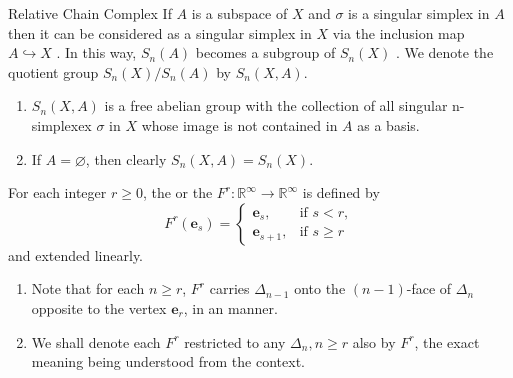 \documentclass[../main.tex]{subfiles}
\begin{document}
\begin{definition}{Relative Chain Complex}{}
    If \(  A  \) is a subspace of \(  X  \) and \(   \sigma   \) is a singular simplex in \(  A  \)  then it can be considered as a singular simplex in \(  X  \) via the inclusion map \(  A\hookrightarrow X  \) .    In this way, \(  S_{n}\left( A \right)   \) becomes a subgroup of \(  S_{n}\left( X \right)   \) . We denote the quotient group \(  S_{n}\left( X \right)/ S_{n}\left( A \right)    \) by \(  S_{n}\left( X,A \right)   \).        
\end{definition}
\begin{remark}
    \begin{enumerate}
        \item \(  S_{n}\left( X,A \right)   \) is a free abelian group with the collection of all singular n-simplexex \(   \sigma    \) in \(  X  \) whose image is not contained in \(  A  \) as a basis.    
        \item If \(  A = \varnothing  \), then clearly \(  S_{n}\left( X,A \right)=  S_{n}   \left( X \right) \).  
    \end{enumerate}
    
\end{remark}
\begin{definition}{}{}
For each integer $r \ge 0$, the  or the  $F^r : \mathbb{R}^\infty \to \mathbb{R}^\infty$ is defined by
\[
F^r(\mathbf{e}_s) = \begin{cases} \mathbf{e}_s, & \text{if } s < r, \\ \mathbf{e}_{s+1}, & \text{if } s \ge r \end{cases}
\]
and extended linearly.
\end{definition}

\begin{remark}{}{}
\begin{enumerate}
    \item Note that for each $n \ge r$, $F^r$ carries $\Delta_{n-1}$ onto the $(n-1)$-face of $\Delta_n$ opposite to the vertex $\mathbf{e}_r$, in an  manner.
    \item We shall denote each $F^r$ restricted to any $\Delta_n, n \ge r$ also by $F^r$, the exact meaning being understood from the context. 
\end{enumerate}
 
\end{remark}
\end{document}
